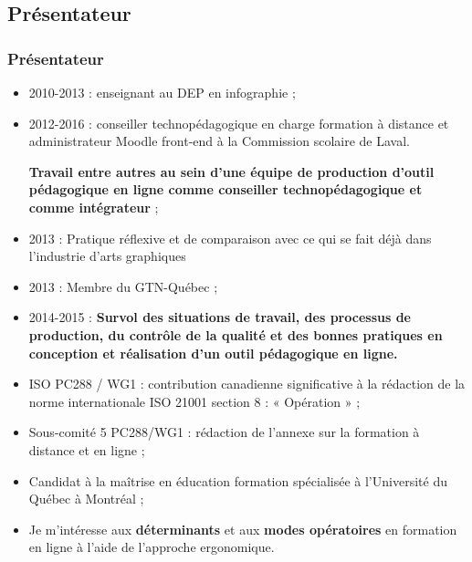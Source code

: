 		
	\subsection{Présentateur} 
		\begin{frame}[allowframebreaks]
			\frametitle{Présentateur}
			\begin {itemize}
				
                                \item 2010-2013 : enseignant au DEP en  infographie ;
                                \item 2012-2016 : conseiller technopédagogique en charge formation à distance et administrateur Moodle front-end à la Commission scolaire de Laval. \par \textbf{Travail entre autres au sein d’une équipe de production d’outil pédagogique en ligne comme conseiller technopédagogique et comme intégrateur} ;
                                \item 2013 : Pratique réflexive et de comparaison avec ce qui se fait déjà dans l’industrie d’arts graphiques
                                \item 2013 : Membre du GTN-Québec ;
                                \item 2014-2015 : \textbf{Survol des situations de travail, des processus de production, du contrôle de la qualité et des bonnes pratiques en conception et réalisation d’un outil pédagogique en ligne.}  
                                \item ISO PC288 / WG1 : contribution canadienne significative à la rédaction de la norme internationale ISO 21001 section 8 : « Opération » ;
                                \item Sous-comité 5 PC288/WG1 : rédaction de l’annexe sur la formation à distance et en ligne ;
                                \item Candidat à la maîtrise en éducation formation spécialisée à l'Université du Québec à Montréal ;
                                \item Je m'intéresse aux \textbf{déterminants} et aux \textbf{modes opératoires} en formation en ligne à l’aide de l’approche ergonomique.



			\end{itemize}
		\end{frame}
			
